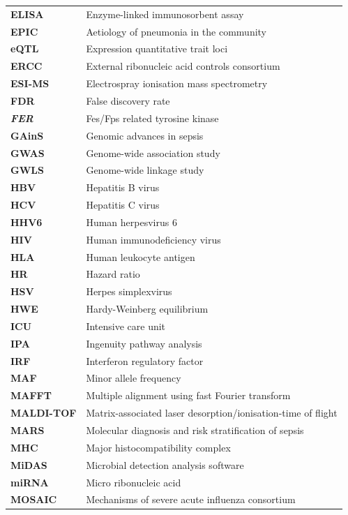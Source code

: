 \begin{longtable}[l]{l l}
		\textbf{ELISA} & Enzyme-linked immunosorbent assay\\
		\textbf{EPIC} & Aetiology of pneumonia in the community\\
		\textbf{eQTL} & Expression quantitative trait loci\\
		\textbf{ERCC} & External ribonucleic acid controls consortium\\
		\textbf{ESI-MS} & Electrospray ionisation mass spectrometry\\
		\textbf{FDR} & False discovery rate\\
		\textit{\textbf{FER}} & Fes/Fps related tyrosine kinase\\
		\textbf{GAinS} & Genomic advances in sepsis\\
		\textbf{GWAS} & Genome-wide association study\\
		\textbf{GWLS} & Genome-wide linkage study\\
		\textbf{HBV} & Hepatitis B virus\\
		\textbf{HCV} & Hepatitis C virus\\
		\textbf{HHV6} & Human herpesvirus 6\\
		\textbf{HIV} & Human immunodeficiency virus\\
		\textbf{HLA} & Human leukocyte antigen\\
		\textbf{HR} & Hazard ratio\\
		\textbf{HSV} & Herpes simplexvirus\\
		\textbf{HWE} & Hardy-Weinberg equilibrium\\
		\textbf{ICU} & Intensive care unit\\
		\textbf{IPA} & Ingenuity pathway analysis\\
		\textbf{IRF} & Interferon regulatory factor\\
		\textbf{MAF} & Minor allele frequency\\
		\textbf{MAFFT} & Multiple alignment using fast Fourier transform\\
		\textbf{MALDI-TOF} & Matrix-associated laser desorption/ionisation-time of flight\\
		\textbf{MARS} & Molecular diagnosis and risk stratification of sepsis\\
		\textbf{MHC} & Major histocompatibility complex\\
		\textbf{MiDAS} & Microbial detection analysis software\\
		\textbf{miRNA} & Micro ribonucleic acid\\
		\textbf{MOSAIC} & Mechanisms of severe acute influenza consortium\\

\end{longtable}
